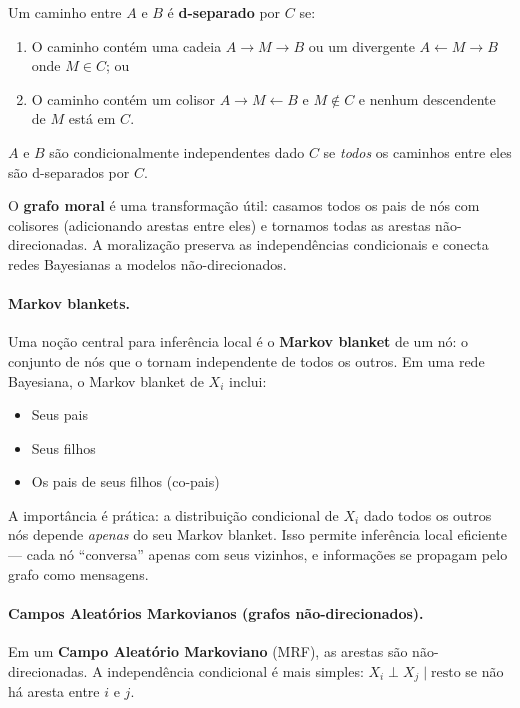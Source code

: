 \documentclass{tufte-handout}
\begin{document}
\begin{defn}[d-separação]
    Um caminho entre $A$ e $B$ é \textbf{d-separado} por $C$ se:
    \begin{enumerate}
        \item O caminho contém uma cadeia $A \to M \to B$ ou um divergente $A \leftarrow M \to B$ onde $M \in C$; ou
        \item O caminho contém um colisor $A \to M \leftarrow B$ e $M \notin C$ e nenhum descendente de $M$ está em $C$.
    \end{enumerate}
    $A$ e $B$ são condicionalmente independentes dado $C$ se \textit{todos} os caminhos entre eles são d-separados por $C$.
\end{defn}

O \textbf{grafo moral} é uma transformação útil: casamos todos os pais de nós com colisores (adicionando arestas entre eles) e tornamos todas as arestas não-direcionadas. A moralização preserva as independências condicionais e conecta redes Bayesianas a modelos não-direcionados.

\paragraph{Markov blankets.}

Uma noção central para inferência local é o \textbf{Markov blanket} de um nó: o conjunto de nós que o tornam independente de todos os outros. Em uma rede Bayesiana, o Markov blanket de $X_i$ inclui:
\begin{itemize}
    \item Seus pais
    \item Seus filhos
    \item Os pais de seus filhos (co-pais)
\end{itemize}

A importância é prática: a distribuição condicional de $X_i$ dado todos os outros nós depende \textit{apenas} do seu Markov blanket. Isso permite inferência local eficiente --- cada nó ``conversa'' apenas com seus vizinhos, e informações se propagam pelo grafo como mensagens.

\paragraph{Campos Aleatórios Markovianos (grafos não-direcionados).}

Em um \textbf{Campo Aleatório Markoviano} (MRF), as arestas são não-direcionadas. A independência condicional é mais simples: $X_i \perp X_j \mid \text{resto}$ se não há aresta entre $i$ e $j$.
\end{document}
